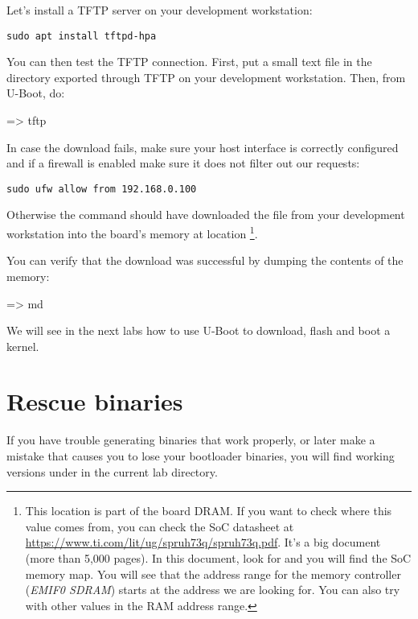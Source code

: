 Let's install a TFTP server on your development workstation:

\begin{verbatim}
sudo apt install tftpd-hpa
\end{verbatim}

You can then test the TFTP connection. First, put a small text file in
the directory exported through TFTP on your development
workstation. Then, from U-Boot, do:

\begin{ubootinput}
=> tftp %
\end{ubootinput}

In case the download fails, make sure your host interface is correctly
configured and if a firewall is enabled make sure it does not filter out our
requests:
\begin{verbatim}
sudo ufw allow from 192.168.0.100
\end{verbatim}

Otherwise the  command should have downloaded the
 file from your development workstation into
the board's memory at location {\tt \zimageboardaddr}\footnote{
This location is part of the board DRAM. If you want
to check where this value comes from, you can check the SoC
datasheet at
\url{https://www.ti.com/lit/ug/spruh73q/spruh73q.pdf}.
It's a big document (more than 5,000 pages). In this document, look
for  and you will find the SoC memory map.
You will see that the address range for the memory controller
({\em EMIF0 SDRAM})
starts at the address we are looking for.
You can also try with other values in the RAM address range.}.

You can verify that the download was successful by dumping the
contents of the memory:

\begin{ubootinput}
=> md %
\end{ubootinput}

We will see in the next labs how to use U-Boot to download, flash and
boot a kernel.


\section{Rescue binaries}

If you have trouble generating binaries that work properly, or later
make a mistake that causes you to lose your bootloader binaries, you
will find working versions under  in the current lab
directory.
